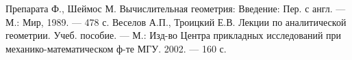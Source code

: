 

\begin{thebibliography}{}
		Препарата Ф., Шеймос М. Вычислительная геометрия: Введение: Пер. с англ. --- М.: Мир, 1989. --- 478 с.
		Веселов А.П., Троицкий Е.В. Лекции по аналитической геометрии. Учеб. пособие. --- М.: Изд-во Центра прикладных исследований при механико-математическом ф-те МГУ. 2002. --- 160 с.
\end{thebibliography}

